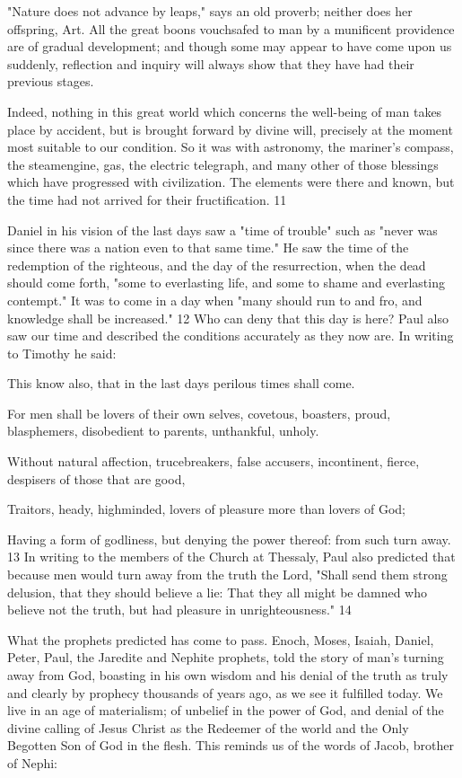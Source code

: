 "Nature does not advance by leaps," says an old proverb; neither does her offspring, Art. All
the great boons vouchsafed to man by a munificent providence are of gradual development;
and though some may appear to have come upon us suddenly, reflection and inquiry will
always show that they have had their previous stages.

Indeed, nothing in this great world which concerns the well-being of man takes place by
accident, but is brought forward by divine will, precisely at the moment most suitable to our
condition. So it was with astronomy, the mariner's compass, the steamengine, gas, the
electric telegraph, and many other of those blessings which have progressed with civilization.
The elements were there and known, but the time had not arrived for their fructification. 11

Daniel in his vision of the last days saw a "time of trouble" such as "never was since there
was a nation even to that same time." He saw the time of the redemption of the righteous, and
the day of the resurrection, when the dead should come forth, "some to everlasting life, and
some to shame and everlasting contempt." It was to come in a day when "many should run to
and fro, and knowledge shall be increased." 12 Who can deny that this day is here? Paul also
saw our time and described the conditions accurately as they now are. In writing to Timothy
he said:

This know also, that in the last days perilous times shall come.

For men shall be lovers of their own selves, covetous, boasters, proud, blasphemers,
disobedient to parents, unthankful, unholy.

Without natural affection, trucebreakers, false accusers, incontinent, fierce, despisers of those
that are good,

Traitors, heady, highminded, lovers of pleasure more than lovers of God;

Having a form of godliness, but denying the power thereof: from such turn away. 13
In writing to the members of the Church at Thessaly, Paul also predicted that because men
would turn away from the truth the Lord, "Shall send them strong delusion, that they should
believe a lie: That they all might be damned who believe not the truth, but had pleasure in
unrighteousness." 14

What the prophets predicted has come to pass. Enoch, Moses, Isaiah, Daniel, Peter, Paul, the
Jaredite and Nephite prophets, told the story of man's turning away from God, boasting in his
own wisdom and his denial of the truth as truly and clearly by prophecy thousands of years
ago, as we see it fulfilled today. We live in an age of materialism; of unbelief in the power of
God, and denial of the divine calling of Jesus Christ as the Redeemer of the world and the
Only Begotten Son of God in the flesh. This reminds us of the words of Jacob, brother of
Nephi:

